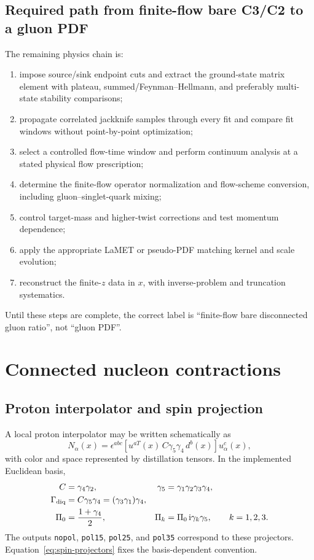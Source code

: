 \documentclass[11pt]{article}
\numberwithin{equation}{section}
\newcommand{\ii}{\mathrm{i}}
\begin{document}
\subsection{Required path from finite-flow bare C3/C2 to a gluon PDF}

The remaining physics chain is:
\begin{enumerate}
  \item impose source/sink endpoint cuts and extract the ground-state matrix
  element with plateau, summed/Feynman--Hellmann, and preferably multi-state
  stability comparisons;
  \item propagate correlated jackknife samples through every fit and compare
  fit windows without point-by-point optimization;
  \item select a controlled flow-time window and perform continuum analysis
  at a stated physical flow prescription;
  \item determine the finite-flow operator normalization and flow-scheme
  conversion, including gluon--singlet-quark mixing;
  \item control target-mass and higher-twist corrections and test momentum
  dependence;
  \item apply the appropriate LaMET or pseudo-PDF matching kernel and scale
  evolution;
  \item reconstruct the finite-\(z\) data in \(x\), with inverse-problem and
  truncation systematics.
\end{enumerate}
Until these steps are complete, the correct label is
``finite-flow bare disconnected gluon ratio'', not ``gluon PDF''.

\section{Connected nucleon contractions}

\subsection{Proton interpolator and spin projection}

A local proton interpolator may be written schematically as
\begin{equation}
  N_\alpha(x)
  =
  \epsilon^{abc}
  \left[u^{aT}(x)\,C\gamma_5\gamma_4\,d^b(x)\right]
  u^c_\alpha(x),
  \label{eq:proton-interpolator}
\end{equation}
with color and space represented by distillation tensors. In the implemented
Euclidean basis,
\begin{align}
  C&=\gamma_4\gamma_2,
  &
  \gamma_5&=\gamma_1\gamma_2\gamma_3\gamma_4,
  \\
  \Gamma_{\rm diq}
  &=C\gamma_5\gamma_4=(\gamma_3\gamma_1)\gamma_4,
  \\
  \Pi_0
  &=\frac{1+\gamma_4}{2},
  &
  \Pi_k
  &=\Pi_0\,\ii\gamma_k\gamma_5,
  \qquad k=1,2,3.
  \label{eq:spin-projectors}
\end{align}
The outputs \texttt{nopol}, \texttt{pol15}, \texttt{pol25}, and
\texttt{pol35} correspond to these projectors. Equation~\eqref{eq:spin-projectors}
fixes the basis-dependent convention.
\end{document}
